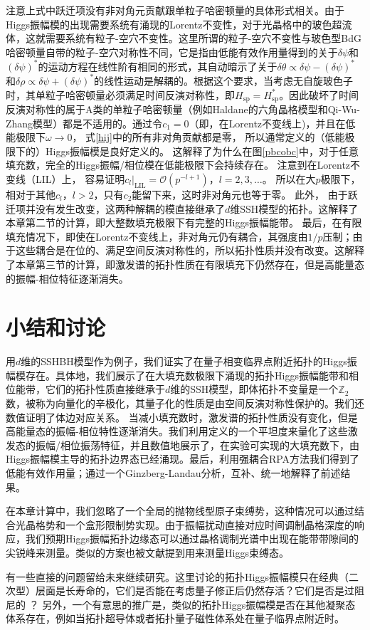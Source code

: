 注意上式中跃迁项没有非对角元贡献跟单粒子哈密顿量的具体形式相关。由于Higgs振幅模的出现需要系统有涌现的Lorentz不变性，对于光晶格中的玻色超流体，这就需要系统有粒子-空穴不变性。这里所谓的粒子-空穴不变性与玻色型BdG哈密顿量自带的粒子-空穴对称性不同，它是指由低能有效作用量得到的关于$\delta\psi$和$(\delta\psi)^*$的运动方程在线性阶有相同的形式，其自动暗示了关于$\delta\theta \propto \delta\psi - (\delta\psi)^*$和$\delta\rho \propto  \delta\psi + (\delta\psi)^*$的线性运动是解耦的。根据这个要求，当考虑无自旋玻色子时，其单粒子哈密顿量必须满足时间反演对称性，即$H_{\text{sp}}=H_{\text{sp}}^*$。因此破坏了时间反演对称性的属于A类的单粒子哈密顿量（例如Haldane的六角晶格模型\cite{Haldane1988}和Qi-Wu-Zhang模型\cite{Qi2006}）都是不适用的。通过令$c_1 = 0$（即，在Lorentz不变线上)，并且在低能极限下$\omega \rightarrow 0$，
式\eqref{hij}中的所有非对角贡献都是零，
所以通常定义的（低能极限下的）Higgs振幅模是良好定义的。
这解释了为什么在图\ref{pbcobc}中，对于任意填充数，完全的Higgs振幅/相位模在低能极限下会持续存在。
注意到在Lorentz不变线（LIL）上，
容易证明$c_l |_{\text{LIL}} =\mathcal{O} (p^{- l+ 1})$，$l = 2,3,\dots$。
所以在大$p$极限下，相对于其他$c_l$，$l>2$，只有$c_2$能留下来，这时非对角元也等于零。
此外，
由于跃迁项并没有发生改变，这两种解耦的模直接继承了$d$维SSH模型的拓扑。这解释了本章第二节的计算，即大整数填充极限下有完整的Higgs振幅能带。
最后，在有限填充情况下，即使在Lorentz不变线上，非对角元仍有耦合，其强度由$1/p$压制；由于这些耦合是在位的、满足空间反演对称性的，所以拓扑性质并没有改变。这解释了本章第三节的计算，即激发谱的拓扑性质在有限填充下仍然存在，但是高能量态的振幅-相位特征逐渐消失。

\section{小结和讨论}

用$d$维的SSHBH模型作为例子，我们证实了在量子相变临界点附近拓扑的Higgs振幅模存在。具体地，我们展示了在大填充数极限下涌现的拓扑Higgs振幅能带和相位能带，它们的拓扑性质直接继承于$d$维的SSH模型，即体拓扑不变量是一个$\mathbb Z_2$数，被称为向量化的辛极化，其量子化的性质是由空间反演对称性保护的。我们还数值证明了体边对应关系。
当减小填充数时，激发谱的拓扑性质没有变化，但是高能量态的振幅-相位特性逐渐消失。我们利用定义的一个平坦度来量化了这些激发态的振幅/相位振荡特征，并且数值地展示了，在实验可实现的大填充数下，由Higgs振幅模主导的拓扑边界态已经涌现。最后，利用强耦合RPA方法我们得到了低能有效作用量；通过一个Ginzberg-Landau分析，互补、统一地解释了前述结果。

在本章计算中，我们忽略了一个全局的抛物线型原子束缚势，这种情况可以通过结合光晶格势和一个盒形限制势实现\cite{Gaunt2013}。由于振幅扰动直接对应时间调制晶格深度的响应\cite{Huber2007}，我们预期Higgs振幅拓扑边缘态可以通过晶格调制光谱中出现在能带带隙间的尖锐峰来测量。类似的方案也被文献\cite{Nakayama2015}提到用来测量Higgs束缚态。

有一些直接的问题留给未来继续研究。这里讨论的拓扑Higgs振幅模只在经典（二次型）层面是长寿命的，它们是否能在考虑量子修正后仍然存活？它们是否是过阻尼的 \cite{Podolsky2011}？
另外，一个有意思的推广是，类似的拓扑Higgs振幅模是否在其他凝聚态体系存在，例如当拓扑超导体或者拓扑量子磁性体系处在量子临界点附近时。
